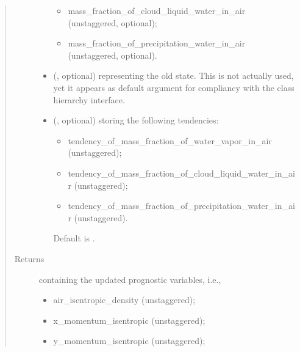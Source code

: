 \documentclass[letterpaper,10pt,english]{sphinxmanual}
\begin{document}
\begin{fulllineitems}
\begin{fulllineitems}
\begin{quote}
\begin{description}
\begin{itemize}
\begin{itemize}
\item {} 
mass\_fraction\_of\_cloud\_liquid\_water\_in\_air (unstaggered, optional);

\item {} 
mass\_fraction\_of\_precipitation\_water\_in\_air (unstaggered, optional).

\end{itemize}


\item {} 
 (, optional) \textendash{} {\hyperref[\detokenize{api:storages.state_isentropic.StateIsentropic}]{}} representing the old state.
This is not actually used, yet it appears as default argument for compliancy with
the class hierarchy interface.

\item {} 
 (, optional) \textendash{} 
{\hyperref[\detokenize{api:storages.grid_data.GridData}]{}} storing the following tendencies:
\begin{itemize}
\item {} 
tendency\_of\_mass\_fraction\_of\_water\_vapor\_in\_air (unstaggered);

\item {} 
tendency\_of\_mass\_fraction\_of\_cloud\_liquid\_water\_in\_air (unstaggered);

\item {} 
tendency\_of\_mass\_fraction\_of\_precipitation\_water\_in\_air (unstaggered).

\end{itemize}

Default is .


\end{itemize}

\item[{Returns}] \leavevmode

{\hyperref[\detokenize{api:storages.state_isentropic.StateIsentropic}]{}} containing the updated prognostic variables, i.e.,
\begin{itemize}
\item {} 
air\_isentropic\_density (unstaggered);

\item {} 
x\_momentum\_isentropic (unstaggered);

\item {} 
y\_momentum\_isentropic (unstaggered);


\end{itemize}
\end{description}
\end{quote}
\end{fulllineitems}
\end{fulllineitems}
\end{document}
